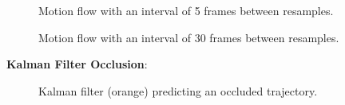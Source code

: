 \documentclass{sciposter}
\begin{document}
\begin{multicols}{3}
\begin{figure}[!h]
	\centering
			\setlength{\fboxsep}{1pt}
			\setlength{\fboxrule}{1pt}
	\caption{Motion flow with an interval of 5 frames between resamples.}
	\label{fig:motion_10}
\end{figure}

\begin{figure}[!h]
	\centering
			\setlength{\fboxsep}{1pt}
			\setlength{\fboxrule}{1pt}
	\caption{Motion flow with an interval of 30 frames between resamples.}
	\label{fig:motion_50}
\end{figure}

\textbf{Kalman Filter Occlusion}:

\begin{figure}[!h]
	\centering
			\setlength{\fboxsep}{1pt}
			\setlength{\fboxrule}{1pt}
	\caption{Kalman filter (orange) predicting an occluded trajectory.}
	\label{fig:occlusion}
\end{figure}


\end{multicols}
\end{document}
